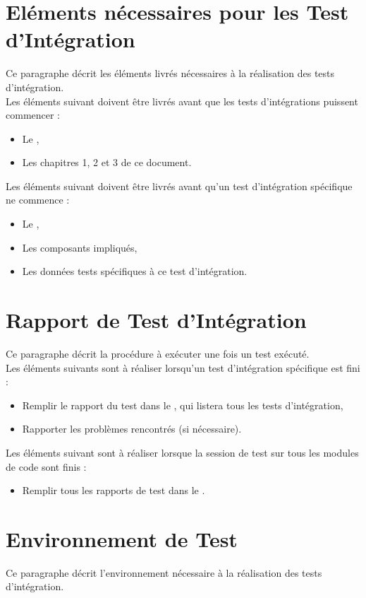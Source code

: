   
  
  \section{Eléments nécessaires pour les Test d'Intégration}
  	Ce paragraphe décrit les éléments livrés nécessaires à la réalisation des tests d'intégration. \\
  	
  	Les éléments suivant doivent être livrés avant que les tests d'intégrations puissent commencer :
  	\begin{itemize}
  		\item Le \PTU,
  		\item Les chapitres 1, 2 et 3 de ce document.
  	\end{itemize}
  	
  	Les éléments suivant doivent être livrés avant qu'un test d'intégration spécifique ne commence :
  	\begin{itemize}
  		\item Le \JTU,
  		\item Les composants impliqués,
  		\item Les données tests spécifiques à ce test d'intégration.
  	\end{itemize}
  
  \section{Rapport de Test d'Intégration}  
  	Ce paragraphe décrit la procédure à exécuter une fois un test exécuté.  \\
  	
  	Les éléments suivants sont à réaliser lorsqu'un test d'intégration spécifique est fini : 
  	\begin{itemize}
  		\item Remplir le rapport du test dans le \JTU, qui listera tous les tests d'intégration,
  		\item Rapporter les problèmes rencontrés (si nécessaire).
  	\end{itemize}
  	
  	Les éléments suivant sont à réaliser  lorsque la session de test sur tous les modules de code sont finis : 
  	\begin{itemize}
  		\item Remplir tous les rapports de test dans le \JTU.
  	\end{itemize}
  
  \section{Environnement de Test}
	  Ce paragraphe décrit l'environnement nécessaire à la réalisation des tests d'intégration. \\
	  
